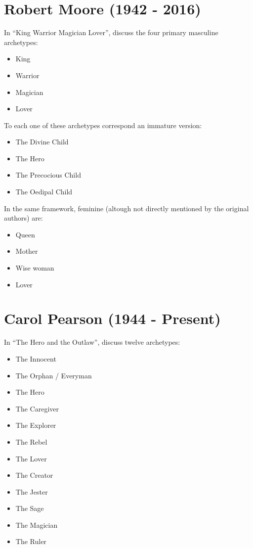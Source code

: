 \documentclass[]{book}
\providecommand{\tightlist}{%
  \setlength{\itemsep}{0pt}\setlength{\parskip}{0pt}}
\begin{document}
\hypertarget{robert-moore-1942---2016}{%
\section{Robert Moore (1942 - 2016)}\label{robert-moore-1942---2016}}

In ``King Warrior Magician Lover'', \citet{moore1991king} discuss the four primary masculine archetypes:

\begin{itemize}
\tightlist
\item
  King
\item
  Warrior
\item
  Magician
\item
  Lover
\end{itemize}

To each one of these archetypes correspond an immature version:

\begin{itemize}
\tightlist
\item
  The Divine Child
\item
  The Hero
\item
  The Precocious Child
\item
  The Oedipal Child
\end{itemize}

In the same framework, feminine (altough not directly mentioned by the original authors) are:

\begin{itemize}
\tightlist
\item
  Queen
\item
  Mother
\item
  Wise woman
\item
  Lover
\end{itemize}

\hypertarget{carol-pearson-1944---present}{%
\section{Carol Pearson (1944 - Present)}\label{carol-pearson-1944---present}}

In ``The Hero and the Outlaw'', \citet{mark2001hero} discuss twelve archetypes:

\begin{itemize}
\tightlist
\item
  The Innocent
\item
  The Orphan / Everyman
\item
  The Hero
\item
  The Caregiver
\item
  The Explorer
\item
  The Rebel
\item
  The Lover
\item
  The Creator
\item
  The Jester
\item
  The Sage
\item
  The Magician
\item
  The Ruler
\end{itemize}
\end{document}
